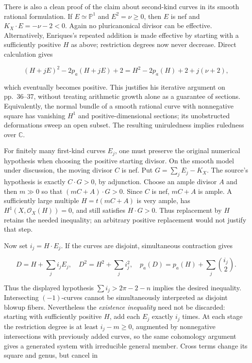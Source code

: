 There is also a clean proof of the claim about second-kind curves in its smooth rational formulation. If \(E\simeq\mathbb P^1\) and \(E^2=\nu\ge0\), then \(E\) is nef and \(K_X\cdot E=-\nu-2<0\). Again no pluricanonical divisor can be effective. Alternatively, Enriques's repeated addition is made effective by starting with a sufficiently positive \(H\) as above; restriction degrees now never decrease. Direct calculation gives

\[
(H+jE)^2-2p_a(H+jE)+2
=H^2-2p_a(H)+2+j(\nu+2),
\]

which eventually becomes positive. This justifies his iterative argument on pp.~36--37, without treating arithmetic growth alone as a guarantee of sections. Equivalently, the normal bundle of a smooth rational curve with nonnegative square has vanishing \(H^1\) and positive-dimensional sections; its unobstructed deformations sweep an open subset. The resulting uniruledness implies ruledness over \(\mathbb C\).

For finitely many first-kind curves \(E_j\), one must preserve the original numerical hypothesis when choosing the positive starting divisor. On the smooth model under discussion, the moving divisor \(C\) is nef. Put \(G=\sum_jE_j-K_X\). The source's hypothesis is exactly \(C\cdot G>0\), by adjunction. Choose an ample divisor \(A\) and then \(m\gg0\) so that \((mC+A)\cdot G>0\). Since \(C\) is nef, \(mC+A\) is ample. A sufficiently large multiple \(H=t(mC+A)\) is very ample, has \(H^1(X,\mathcal O_X(H))=0\), and still satisfies \(H\cdot G>0\). Thus replacement by \(H\) retains the needed inequality; an arbitrary positive replacement would not justify that step.

Now set \(i_j=H\cdot E_j\). If the curves are disjoint, simultaneous contraction gives

\[
D=H+\sum_j i_jE_j,\quad
D^2=H^2+\sum_j i_j^2,\quad
p_a(D)=p_a(H)+\sum_j\binom{i_j}{2}.
\]

Thus the displayed hypothesis \(\sum i_j>2\pi-2-n\) implies the desired inequality. Intersecting \((-1)\)-curves cannot be simultaneously interpreted as disjoint blowup fibers. Nevertheless the \emph{existence inequality} need not be discarded: starting with sufficiently positive \(H\), add each \(E_j\) exactly \(i_j\) times. At each stage the restriction degree is at least \(i_j-m\ge0\), augmented by nonnegative intersections with previously added curves, so the same cohomology argument gives a generated system with irreducible general member. Cross terms change its square and genus, but cancel in

